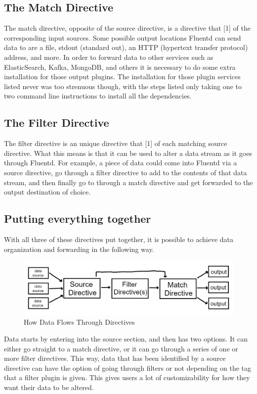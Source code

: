 \documentclass{article}
\begin{document}
\subsection{The Match Directive}
\quad \quad The match directive, opposite of the source directive, is a directive that [1] of the corresponding input sources. Some possible output locations Fluentd can 
send data to are a file, stdout (standard out), an HTTP (hypertext transfer protocol) address, and more. In order to forward data to
other services such as ElasticSearch, Kafka, MongoDB, and others it is necessary to do some extra installation for those output plugins. The installation for those plugin services
listed never was too strenuous though, with the steps listed only taking one to two command line instructions to install all the dependencies.
\subsection{The Filter Directive}
\quad \quad The filter directive is an unique directive that [1] of each matching source directive. What this means is that it can be used to alter a data stream as 
it goes through Fluentd. For example, a piece of data could come into Fluentd via a source directive, go through a filter directive to add to the contents of that data stream, and
then finally go to through a match directive and get forwarded to the output destination of choice.
\subsection{Putting everything together}
\quad \quad With all three of these directives put together, it is possible to achieve data organization and forwarding in the following way.
\begin{figure}[H]
    \centering
    \includegraphics[scale=1]{images/how_it_works.png}
    \caption{How Data Flows Through Directives}
    \label{fig:pic2}
\end{figure}
Data starts by entering into the source section, and then has two options. It can either go straight to a match directive, or it can go through a series of one or more filter directives. 
This way, data that has been identified by a source directive can have the option of going through filters or not depending on the tag that a filter plugin is given. This 
gives users a lot of customizability for how they want their data to be altered.
\end{document}
